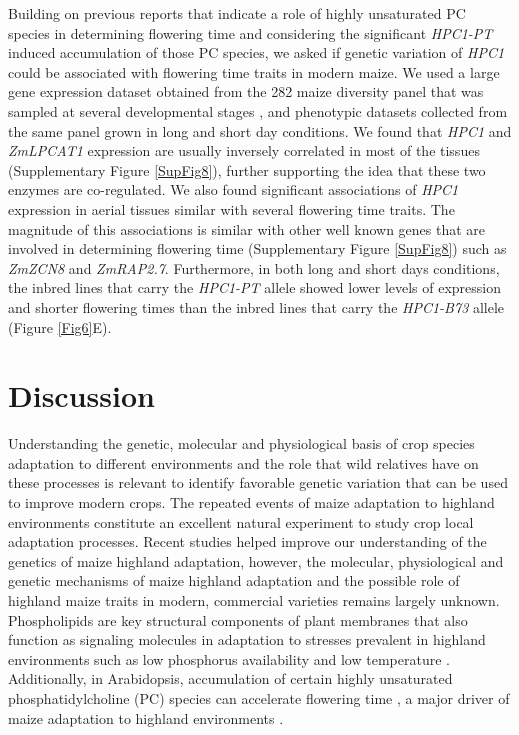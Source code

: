 \documentclass[9pt,twocolumn,twoside,lineno]{BioRxiv}
\begin{document}
Building on previous reports that indicate a role of highly unsaturated PC species in determining flowering time \cite{Nakamura2014-qf, Riedelsheimer2013-bd} and considering the significant \textit{HPC1-PT} induced accumulation of those PC species, we asked if genetic variation of \textit{HPC1} could be associated with flowering time traits in modern maize. 
We used a large gene expression dataset obtained from the 282 maize diversity panel that was sampled at several developmental stages \cite{Kremling2018-gn}, and phenotypic datasets collected from the same panel grown in long and short day conditions.
We found that \textit{HPC1} and \textit{ZmLPCAT1} expression are usually inversely correlated in most of the tissues (Supplementary Figure \ref{SupFig8}), further supporting the idea that these two enzymes are co-regulated. 
We also found significant associations of \textit{HPC1} expression in aerial tissues similar with several flowering time traits. 
The magnitude of this associations is similar with other well known genes that are involved in determining flowering time (Supplementary Figure \ref{SupFig8}) such as \textit{ZmZCN8}  and \textit{ZmRAP2.7}.  
Furthermore, in both long and short days conditions, the inbred lines that carry the \textit{HPC1-PT} allele showed lower levels of expression and shorter flowering times than the inbred lines that carry the \textit{HPC1-B73} allele  (Figure \ref{Fig6}E). 
 \section{Discussion}
\label{sec:discussion}
Understanding the genetic, molecular and  physiological basis of crop species adaptation to different environments and the role that wild relatives have on these processes is relevant to identify favorable genetic variation that can be used to improve modern crops.
The repeated events of maize adaptation to highland environments constitute an excellent natural experiment to study crop local adaptation processes. 
Recent studies \cite{Wang2020-mp, Takuno2015-uj, Crow2020-gene} helped improve our understanding of the genetics of maize highland adaptation, however, the molecular, physiological and genetic mechanisms of maize highland adaptation and the possible role of highland maize traits in modern, commercial varieties remains largely unknown.
Phospholipids are key structural components of plant membranes that also function as signaling molecules in adaptation to stresses prevalent in highland environments \cite{Ryu2004-iv, Nakamura2017-vb} such as low phosphorus availability \cite{Veneklaas2012-ls, Cruz-Ramirez2004-ib, Lambers2012-an} and low temperature \cite{Degenkolbe2012-wf, Welti2002-uk, Marla2017-ph}. 
Additionally, in Arabidopsis, accumulation of certain highly unsaturated phosphatidylcholine (PC) species can accelerate flowering time \cite{Nakamura2014-qf}, a major driver of maize adaptation to highland environments \cite{Romero_Navarro2017-cn, Gates2019-xu}.
 
\end{document}
